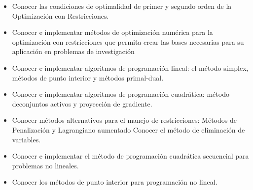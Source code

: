 \documentclass[10pt,a4paper]{article}
\begin{document}
\begin{itemize}
\item Conocer las condiciones de optimalidad de primer y segundo orden de la Optimización con Restricciones.

\item Conocer e implementar métodos de optimización numérica para la optimización con restricciones que permita crear las bases necesarias para su aplicación en problemas de investigación

\item Conocer e implementar algoritmos de programación lineal: el método simplex, métodos de punto interior y métodos primal-dual.

\item Conocer e implementar algoritmos de programación cuadrática: método deconjuntos activos y proyección de gradiente.

\item Conocer métodos alternativos para el manejo de restricciones: Métodos de Penalización y Lagrangiano aumentado Conocer el método de eliminación de variables.

\item Conocer e implementar el método de programación cuadrática secuencial para problemas no lineales.

\item Conocer los métodos de punto interior para programación no lineal.

\end{itemize}

\\
\end{document}
